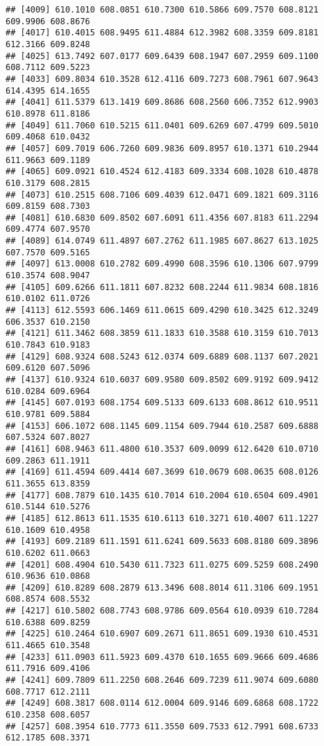 \documentclass[
]{article}
\begin{document}
\begin{verbatim}
## [4009] 610.1010 608.0851 610.7300 610.5866 609.7570 608.8121 609.9906 608.8676
## [4017] 610.4015 608.9495 611.4884 612.3982 608.3359 609.8181 612.3166 609.8248
## [4025] 613.7492 607.0177 609.6439 608.1947 607.2959 609.1100 608.7112 609.5223
## [4033] 609.8034 610.3528 612.4116 609.7273 608.7961 607.9643 614.4395 614.1655
## [4041] 611.5379 613.1419 609.8686 608.2560 606.7352 612.9903 610.8978 611.8186
## [4049] 611.7060 610.5215 611.0401 609.6269 607.4799 609.5010 609.4068 610.0432
## [4057] 609.7019 606.7260 609.9836 609.8957 610.1371 610.2944 611.9663 609.1189
## [4065] 609.0921 610.4524 612.4183 609.3334 608.1028 610.4878 610.3179 608.2815
## [4073] 610.2515 608.7106 609.4039 612.0471 609.1821 609.3116 609.8159 608.7303
## [4081] 610.6830 609.8502 607.6091 611.4356 607.8183 611.2294 609.4774 607.9570
## [4089] 614.0749 611.4897 607.2762 611.1985 607.8627 613.1025 607.7570 609.5165
## [4097] 613.0008 610.2782 609.4990 608.3596 610.1306 607.9799 610.3574 608.9047
## [4105] 609.6266 611.1811 607.8232 608.2244 611.9834 608.1816 610.0102 611.0726
## [4113] 612.5593 606.1469 611.0615 609.4290 610.3425 612.3249 606.3537 610.2150
## [4121] 611.3462 608.3859 611.1833 610.3588 610.3159 610.7013 610.7843 610.9183
## [4129] 608.9324 608.5243 612.0374 609.6889 608.1137 607.2021 609.6120 607.5096
## [4137] 610.9324 610.6037 609.9580 609.8502 609.9192 609.9412 610.0284 609.6964
## [4145] 607.0193 608.1754 609.5133 609.6133 608.8612 610.9511 610.9781 609.5884
## [4153] 606.1072 608.1145 609.1154 609.7944 610.2587 609.6888 607.5324 607.8027
## [4161] 608.9463 611.4800 610.3537 609.0099 612.6420 610.0710 609.2863 611.1911
## [4169] 611.4594 609.4414 607.3699 610.0679 608.0635 608.0126 611.3655 613.8359
## [4177] 608.7879 610.1435 610.7014 610.2004 610.6504 609.4901 610.5144 610.5276
## [4185] 612.8613 611.1535 610.6113 610.3271 610.4007 611.1227 610.1609 610.4958
## [4193] 609.2189 611.1591 611.6241 609.5633 608.8180 609.3896 610.6202 611.0663
## [4201] 608.4904 610.5430 611.7323 611.0275 609.5259 608.2490 610.9636 610.0868
## [4209] 610.8289 608.2879 613.3496 608.8014 611.3106 609.1951 608.8574 608.5532
## [4217] 610.5802 608.7743 608.9786 609.0564 610.0939 610.7284 610.6388 609.8259
## [4225] 610.2464 610.6907 609.2671 611.8651 609.1930 610.4531 611.4665 610.3548
## [4233] 611.0903 611.5923 609.4370 610.1655 609.9666 609.4686 611.7916 609.4106
## [4241] 609.7809 611.2250 608.2646 609.7239 611.9074 609.6080 608.7717 612.2111
## [4249] 608.3817 608.0114 612.0004 609.9146 609.6868 608.1722 610.2358 608.6057
## [4257] 608.3954 610.7773 611.3550 609.7533 612.7991 608.6733 612.1785 608.3371

\end{verbatim}
\end{document}
